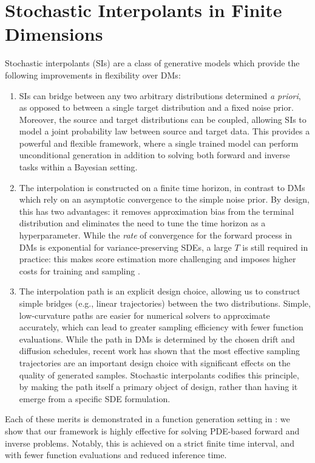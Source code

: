 \section{Stochastic Interpolants in Finite Dimensions}
Stochastic interpolants (SIs) are a class of generative models which provide the following improvements in flexibility over DMs:
\begin{enumerate}
  \item SIs can bridge between any two arbitrary distributions determined \textit{a priori}, as opposed to between a single target distribution and a fixed noise prior. Moreover, the source and target distributions can be coupled, allowing SIs to model a joint probability law between source and target data. This provides a powerful and flexible framework, where a single trained model can perform unconditional generation in addition to solving both forward and inverse tasks within a Bayesian setting.
  \item The interpolation is constructed on a finite time horizon, in contrast to DMs which rely on an asymptotic convergence to the simple noise prior.  By design, this has two advantages: it removes approximation bias from the terminal distribution and eliminates the need to tune the time horizon as a hyperparameter. While the \textit{rate} of convergence for the forward process in DMs is exponential for variance-preserving SDEs, a large \(T\) is still required in practice: this makes score estimation more challenging and imposes higher costs for training and sampling \citep{franzese2023much}.
  \item The interpolation path is an explicit design choice, allowing us to construct simple bridges (e.g., linear trajectories) between the two distributions. Simple, low-curvature paths are easier for numerical solvers to approximate accurately, which can lead to greater sampling efficiency with fewer function evaluations. While the path in DMs is determined by the chosen drift and diffusion schedules, recent work \citep{karras2022elucidating,williams2024score} has shown that the most effective sampling trajectories are an important design choice with significant effects on the quality of generated samples. Stochastic interpolants codifies this principle, by making the path itself a primary object of design, rather than having it emerge from a specific SDE formulation.
\end{enumerate}

Each of these merits is demonstrated in a function generation setting in : we show that our framework is highly effective for solving PDE-based forward and inverse problems. Notably, this is achieved on a strict finite time interval, and with fewer function evaluations and reduced inference time.

